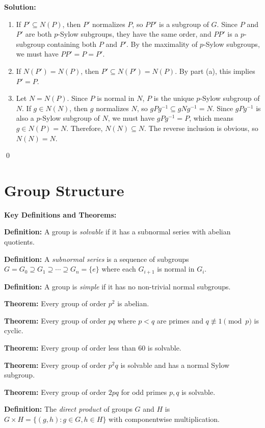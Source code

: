 \noindent\textbf{Solution:}
\begin{enumerate}[label=(\alph*)]
\item If $P' \subseteq N(P)$, then $P'$ normalizes $P$, so $PP'$ is a subgroup of $G$. Since $P$ and $P'$ are both $p$-Sylow subgroups, they have the same order, and $PP'$ is a $p$-subgroup containing both $P$ and $P'$. By the maximality of $p$-Sylow subgroups, we must have $PP' = P = P'$.

\item If $N(P') = N(P)$, then $P' \subseteq N(P') = N(P)$. By part (a), this implies $P' = P$.

\item Let $N = N(P)$. Since $P$ is normal in $N$, $P$ is the unique $p$-Sylow subgroup of $N$. If $g \in N(N)$, then $g$ normalizes $N$, so $gPg^{-1} \subseteq gNg^{-1} = N$. Since $gPg^{-1}$ is also a $p$-Sylow subgroup of $N$, we must have $gPg^{-1} = P$, which means $g \in N(P) = N$. Therefore, $N(N) \subseteq N$. The reverse inclusion is obvious, so $N(N) = N$.
\end{enumerate}


\qed
\section{Group Structure}

\textbf{Key Definitions and Theorems:}

\textbf{Definition:} A group is \textit{solvable} if it has a subnormal series with abelian quotients.

\textbf{Definition:} A \textit{subnormal series} is a sequence of subgroups $G = G_0 \supseteq G_1 \supseteq \cdots \supseteq G_n = \{e\}$ where each $G_{i+1}$ is normal in $G_i$.

\textbf{Definition:} A group is \textit{simple} if it has no non-trivial normal subgroups.

\textbf{Theorem:} Every group of order $p^2$ is abelian.

\textbf{Theorem:} Every group of order $pq$ where $p < q$ are primes and $q \not\equiv 1 \pmod{p}$ is cyclic.

\textbf{Theorem:} Every group of order less than 60 is solvable.

\textbf{Theorem:} Every group of order $p^2q$ is solvable and has a normal Sylow subgroup.

\textbf{Theorem:} Every group of order $2pq$ for odd primes $p, q$ is solvable.

\textbf{Definition:} The \textit{direct product} of groups $G$ and $H$ is $G \times H = \{(g,h) : g \in G, h \in H\}$ with componentwise multiplication.

